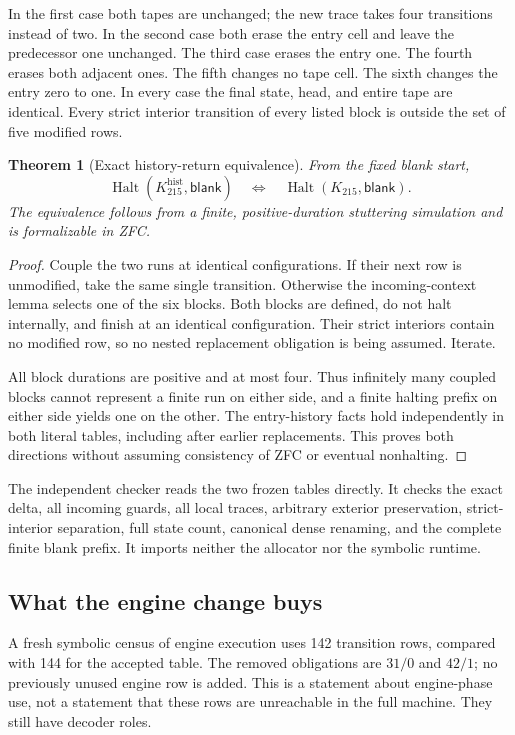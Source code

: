 \documentclass[11pt]{article}
\newtheorem{theorem}{Theorem}[section]
\theoremstyle{definition}
\newcommand{\Halt}{\operatorname{Halt}}
\newcommand{\blank}{\mathsf{blank}}
\newcommand{\Kbase}{K_{215}}
\newcommand{\Kctx}{K_{215}^{\mathrm{hist}}}
\begin{document}
In the first case both tapes are unchanged; the new trace takes four
transitions instead of two. In the second case both erase the entry cell
and leave the predecessor one unchanged. The third case erases the entry
one. The fourth erases both adjacent ones. The fifth changes no tape cell.
The sixth changes the entry zero to one. In every case the final state,
head, and entire tape are identical. Every strict interior transition of
every listed block is outside the set of five modified rows.

\begin{theorem}[Exact history-return equivalence]
From the fixed blank start,
\[
 \Halt(\Kctx,\blank)\quad\Longleftrightarrow\quad
 \Halt(\Kbase,\blank).
\]
The equivalence follows from a finite, positive-duration stuttering
simulation and is formalizable in ZFC.
\end{theorem}
\begin{proof}
Couple the two runs at identical configurations. If their next row is
unmodified, take the same single transition. Otherwise the incoming-context
lemma selects one of the six blocks. Both blocks are defined, do not halt
internally, and finish at an identical configuration. Their strict
interiors contain no modified row, so no nested replacement obligation is
being assumed. Iterate.

All block durations are positive and at most four. Thus infinitely many
coupled blocks cannot represent a finite run on either side, and a finite
halting prefix on either side yields one on the other. The entry-history
facts hold independently in both literal tables, including after earlier
replacements. This proves both directions without assuming consistency of
ZFC or eventual nonhalting.
\end{proof}

The independent checker  reads the two frozen
tables directly. It checks the exact delta, all incoming guards, all local
traces, arbitrary exterior preservation, strict-interior separation, full
state count, canonical dense renaming, and the complete finite blank
prefix. It imports neither the allocator nor the symbolic runtime.

\subsection{What the engine change buys}

A fresh symbolic census of engine execution uses 142 transition rows,
compared with 144 for the accepted table. The removed obligations are
\(31/0\) and \(42/1\); no previously unused engine row is added. This is a
statement about engine-phase use, not a statement that these rows are
unreachable in the full machine. They still have decoder roles.
\end{document}
